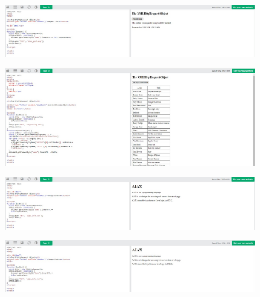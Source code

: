 \documentclass{article}
\begin{document}
\begin{itemize}
\begin{figure}[H]
		\end{figure}
		\begin{figure}[H]
			\centering
			\includegraphics[width=1.0\textwidth,keepaspectratio]{img/w5.jpg}
		\end{figure}
		\begin{figure}[H]
			\centering
			\includegraphics[width=1.0\textwidth,keepaspectratio]{img/w6.jpg}
		\end{figure}
		\begin{figure}[H]
			\centering
			\includegraphics[width=1.0\textwidth,keepaspectratio]{img/w7.jpg}
		\end{figure}
		\begin{figure}[H]
			\centering
			\includegraphics[width=1.0\textwidth,keepaspectratio]{img/w8.jpg}

\end{figure}
\end{itemize}
\end{document}
